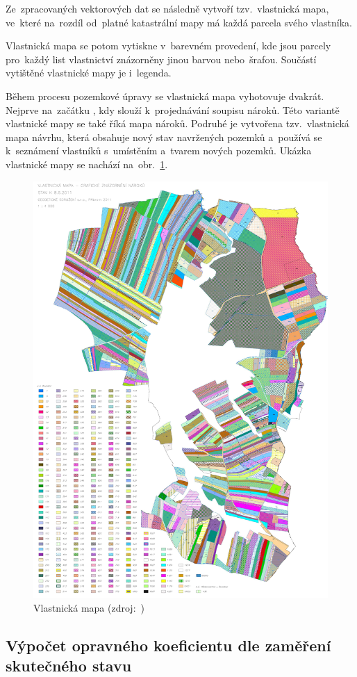 Ze~zpracovaných vektorových dat se následně vytvoří tzv.~vlastnická
mapa, ve~které na~rozdíl od~platné katastrální mapy má každá parcela
svého vlastníka.

Vlastnická mapa se potom vytiskne v~barevném provedení, kde jsou
parcely pro~každý list vlastnictví znázorněny jinou barvou
nebo~šrafou. Součástí vytištěné vlastnické mapy je i~legenda.

Během procesu pozemkové úpravy se vlastnická mapa vyhotovuje
dvakrát. Nej\-prve na~začátku , kdy slouží k~projednávání
soupisu nároků. Této variantě vlastnické mapy se také říká mapa
nároků. Podruhé je vytvořena tzv.~vlastnická mapa návrhu, která obsahuje nový
stav navržených pozemků a~používá se k~seznámení vlastníků s~umístěním
a~tvarem nových pozemků. Ukázka vlastnické mapy se nachází
na~obr.~\ref{fig:vlastnicka_mapa}.

	\begin{figure}[H] \centering
		\includegraphics[width=.8\textwidth]{./pictures/vlastnicka_mapa.pdf}
		\caption[Vlastnická mapa]{Vlastnická mapa
(zdroj:~\citep{skvorec})}
		\label{fig:vlastnicka_mapa}
 	\end{figure}

\subsection{Výpočet opravného koeficientu dle zaměření skutečného stavu}
\label{vypocet_ok}

